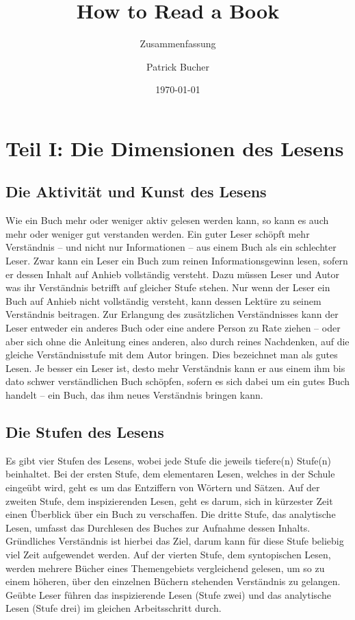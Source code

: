 \documentclass[a4paper,11pt]{scrartcl}
\begin{document}
\title{How to Read a Book\\\cite{adler-vandooren}}
\subtitle{Zusammenfassung}
\author{Patrick Bucher}
\date{\today}
\maketitle

\tableofcontents

\newpage
\section*{Teil I: Die Dimensionen des Lesens}

\subsection{Die Aktivität und Kunst des Lesens}

Wie ein Buch mehr oder weniger aktiv gelesen werden kann, so kann es auch mehr oder weniger gut verstanden werden. Ein guter Leser schöpft mehr Verständnis – und nicht nur Informationen – aus einem Buch als ein schlechter Leser. Zwar kann ein Leser ein Buch zum reinen Informationsgewinn lesen, sofern er dessen Inhalt auf Anhieb vollständig versteht. Dazu müssen Leser und Autor was ihr Verständnis betrifft auf gleicher Stufe stehen. Nur wenn der Leser ein Buch auf Anhieb nicht vollständig versteht, kann dessen Lektüre zu seinem Verständnis beitragen. Zur Erlangung des zusätzlichen Verständnisses kann der Leser entweder ein anderes Buch oder eine andere Person zu Rate ziehen – oder aber sich ohne die Anleitung eines anderen, also durch reines Nachdenken, auf die gleiche Verständnisstufe mit dem Autor bringen. Dies bezeichnet man als gutes Lesen. Je besser ein Leser ist, desto mehr Verständnis kann er aus einem ihm bis dato schwer verständlichen Buch schöpfen, sofern es sich dabei um ein gutes Buch handelt – ein Buch, das ihm neues Verständnis bringen kann.

\subsection{Die Stufen des Lesens}

Es gibt vier Stufen des Lesens, wobei jede Stufe die jeweils tiefere(n) Stufe(n) beinhaltet. Bei der ersten Stufe, dem elementaren Lesen, welches in der Schule eingeübt wird, geht es um das Entziffern von Wörtern und Sätzen. Auf der zweiten Stufe, dem inspizierenden Lesen, geht es darum, sich in kürzester Zeit einen Überblick über ein Buch zu verschaffen. Die dritte Stufe, das analytische Lesen, umfasst das Durchlesen des Buches zur Aufnahme dessen Inhalts. Gründliches Verständnis ist hierbei das Ziel, darum kann für diese Stufe beliebig viel Zeit aufgewendet werden. Auf der vierten Stufe, dem syntopischen Lesen, werden mehrere Bücher eines Themengebiets vergleichend gelesen, um so zu einem höheren, über den einzelnen Büchern stehenden Verständnis zu gelangen. Geübte Leser führen das inspizierende Lesen (Stufe zwei) und das analytische Lesen (Stufe drei) im gleichen Arbeitsschritt durch.
\end{document}
